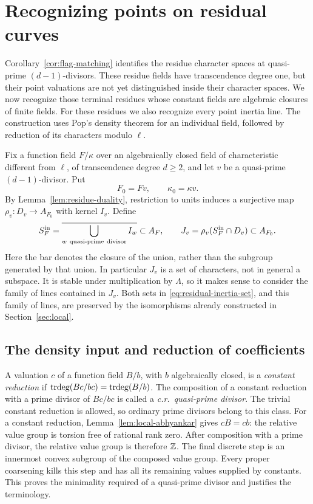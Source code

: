 \section{Recognizing points on residual curves}\label{sec:residual-curves}

Corollary~\ref{cor:flag-matching} identifies the residue character spaces at
quasi-prime \((d-1)\)-divisors. These residue fields have transcendence
degree one, but their point valuations are not yet distinguished inside
their character spaces. We now recognize those terminal residues whose
constant fields are algebraic closures of finite fields. For these
residues we also recognize every point inertia line. The construction
uses Pop's density theorem for an individual field, followed by reduction
of its characters modulo \(\ell\).

Fix a function field \(F/\kappa\) over an algebraically closed field
of characteristic different from \(\ell\), of transcendence degree
\(d\geq 2\), and let
\(v\) be a quasi-prime \((d-1)\)-divisor. Put
\[
 F_0=Fv,\qquad \kappa_0=\kappa v.
\]
By Lemma~\ref{lem:residue-duality}, restriction to units induces a
surjective map \(\rho_v:D_v\to A_{F_0}\) with kernel \(I_v\).
Define
\begin{equation}\label{eq:residual-inertia-set}
 S_F^{\mathrm{in}}
   =\overline{\bigcup_{w\ {\rm quasi\text{-}prime\ divisor}} I_w}
       \subset A_F,
 \qquad
 J_v=\rho_v(S_F^{\mathrm{in}}\cap D_v)\subset A_{F_0}.
\end{equation}
Here the bar denotes the closure of the union, rather than the subgroup
generated by that union. In particular \(J_v\) is a set of characters,
not in general a subspace. It is stable under multiplication by
\(\Lambda\), so it makes sense to consider the family of lines contained
in \(J_v\). Both sets in \eqref{eq:residual-inertia-set}, and this family
of lines, are preserved by the isomorphisms already constructed in
Section~\ref{sec:local}.

\subsection{The density input and reduction of coefficients}

A valuation \(c\) of a function field \(B/b\), with \(b\) algebraically
closed, is a
\emph{constant reduction} if
\(\operatorname{trdeg}(Bc/bc)=\operatorname{trdeg}(B/b)\).
The composition of a constant reduction with a prime divisor of
\(Bc/bc\) is called a \emph{c.r.\ quasi-prime divisor}.
The trivial constant reduction is allowed, so ordinary prime divisors
belong to this class.
For a constant reduction, Lemma~\ref{lem:local-abhyankar} gives
\(cB=cb\): the relative value group is torsion free of rational rank
zero. After composition with a prime divisor, the relative value
group is therefore \(\mathbb Z\). The final discrete step is an innermost
convex subgroup of the composed value group. Every proper coarsening
kills this step and has all its remaining values supplied by
constants. This proves the minimality required of a quasi-prime
divisor and justifies the terminology.

